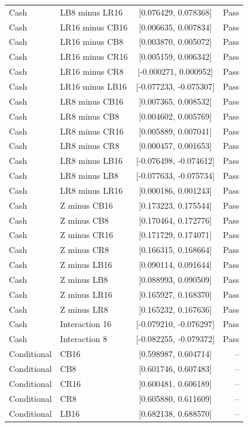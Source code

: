 {\begin{longtable}{llcr}
Cash & LB8 minus LR16 & [0.076429, 0.078368] & Pass \\
Cash & LR16 minus CB16 & [0.006635, 0.007834] & Pass \\
Cash & LR16 minus CB8 & [0.003870, 0.005072] & Pass \\
Cash & LR16 minus CR16 & [0.005159, 0.006342] & Pass \\
Cash & LR16 minus CR8 & [-0.000271, 0.000952] & Pass \\
Cash & LR16 minus LB16 & [-0.077233, -0.075307] & Pass \\
Cash & LR8 minus CB16 & [0.007365, 0.008532] & Pass \\
Cash & LR8 minus CB8 & [0.004602, 0.005769] & Pass \\
Cash & LR8 minus CR16 & [0.005889, 0.007041] & Pass \\
Cash & LR8 minus CR8 & [0.000457, 0.001653] & Pass \\
Cash & LR8 minus LB16 & [-0.076498, -0.074612] & Pass \\
Cash & LR8 minus LB8 & [-0.077633, -0.075734] & Pass \\
Cash & LR8 minus LR16 & [0.000186, 0.001243] & Pass \\
Cash & Z minus CB16 & [0.173223, 0.175544] & Pass \\
Cash & Z minus CB8 & [0.170464, 0.172776] & Pass \\
Cash & Z minus CR16 & [0.171729, 0.174071] & Pass \\
Cash & Z minus CR8 & [0.166315, 0.168664] & Pass \\
Cash & Z minus LB16 & [0.090114, 0.091644] & Pass \\
Cash & Z minus LB8 & [0.088993, 0.090509] & Pass \\
Cash & Z minus LR16 & [0.165927, 0.168370] & Pass \\
Cash & Z minus LR8 & [0.165232, 0.167636] & Pass \\
Cash & Interaction 16 & [-0.079210, -0.076297] & Pass \\
Cash & Interaction 8 & [-0.082255, -0.079372] & Pass \\
Conditional & CB16 & [0.598987, 0.604714] & -- \\
Conditional & CB8 & [0.601746, 0.607483] & -- \\
Conditional & CR16 & [0.600481, 0.606189] & -- \\
Conditional & CR8 & [0.605880, 0.611609] & -- \\
Conditional & LB16 & [0.682138, 0.688570] & -- \\

\end{longtable}}
